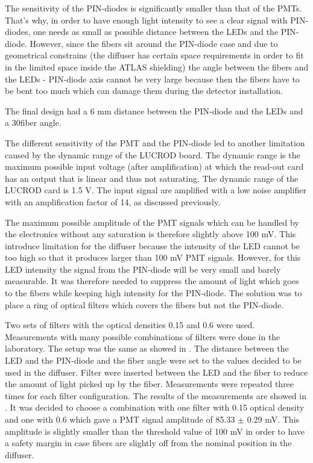 The sensitivity of the PIN-diodes is significantly smaller than that of the PMTs.
That's why, in order to have enough light intensity to see a clear signal with PIN-diodes, one needs as small as possible
distance between the LEDs and the PIN-diode. However, since the fibers sit around the PIN-diode case and due to geometrical constrains 
(the diffuser has certain space requirements in order to fit in the limited space inside the ATLAS shielding) 
the angle between the fibers and the LEDs - PIN-diode axis cannot be very large because then
the fibers have to be bent too much which can damage them during the detector installation.

The final design had a 6 mm distance between the PIN-diode and the LEDs and a 30\degree fiber angle.

The different sensitivity of the PMT and the PIN-diode led to another limitation caused by the dynamic range of the LUCROD board.
The dynamic range is the maximum possible input voltage (after amplification) at which the read-out card has an output that is linear and thus not saturating.
The dynamic range of the LUCROD card is 1.5 V. 
The input signal are amplified with a low noise amplifier with an amplification factor of 14, as discussed previously. 

The maximum possible amplitude of the PMT signals which can be handled by the electronics without any saturation is therefore slightly above 100 mV.
This introduce limitation for the diffuser because the intensity of the LED cannot be too high so that it produces larger than 100 mV PMT signals.
However, for this LED intensity the signal from the PIN-diode will be very small and barely measurable.
It was therefore needed to suppress the amount of light which goes to the fibers while keeping high intensity for the PIN-diode.
The solution was to place a ring of optical filters which covers the fibers but not the PIN-diode.

Two sets of filters with the optical densities 0.15 and 0.6 were used. 
Measurements with many possible combinations of filters were done in the laboratory.
The setup was the same as showed in . The distance between the LED and the PIN-diode 
and the fiber angle were set to the values 
decided to be used in the diffuser. 
Filter were inserted between the LED and the fiber to reduce the amount of light picked up by the fiber.
Measurements were repeated three times for each filter configuration. The results of the measurements are showed in .
It was decided to choose a combination with one filter with 0.15 optical density and one with 0.6 which gave a PMT signal amplitude of 85.33 $\pm$ 0.29 mV.
This amplitude is slightly smaller than the threshold value of 100 mV in order to have a safety margin in case fibers 
are slightly off from the nominal position in the diffuser.


